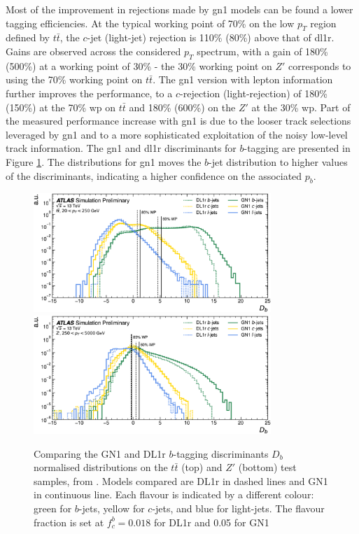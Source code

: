 Most of the improvement in rejections made by \gls{gn1} models can be found a lower tagging efficiencies. At the typical working point of 70\% on the low $p_T$ region defined by $t\bar{t}$, the $c$-jet (light-jet) rejection is 110\% (80\%) above that of \gls{dl1r}. Gains are observed across the considered $p_T$ spectrum, with a gain of 180\% (500\%) at a working point of 30\% - the 30\% working point on $Z'$ corresponds to using the 70\% working point on $t\bar{t}$. The \gls{gn1} version with lepton information further improves the performance, to a $c$-rejection (light-rejection) of 180\% (150\%) at the 70\% \gls{wp} on $t\bar{t}$ and 180\% (600\%) on the $Z'$ at the 30\% \gls{wp}. Part of the measured performance increase with \gls{gn1} is due to the looser track selections leveraged by \gls{gn1} and to a more sophisticated exploitation of the noisy low-level track information. The \gls{gn1} and \gls{dl1r} discriminants for $b$-tagging are presented in Figure \ref{fig:GN1disb}. The distributions for \gls{gn1} moves the $b$-jet distribution to higher values of the discriminants, indicating a higher confidence on the associated $p_b$. \\

\begin{figure}[h!]
  \centering
  \includegraphics[width=0.8\textwidth]{Images/FTAG/GN/GN1/eff/ttb.png}
  \includegraphics[width=0.8\textwidth]{Images/FTAG/GN/GN1/eff/zpb.png}
  \caption{Comparing the GN1 and DL1r $b$-tagging discriminants $D_b$ normalised distributions on the $t\bar{t}$ (top) and $Z'$ (bottom) test samples, from \cite{ATL-PHYS-PUB-2022-027}. Models compared are DL1r in dashed lines and GN1 in continuous line. Each flavour is indicated by a different colour: green for $b$-jets, yellow for $c$-jets, and blue for light-jets. The flavour fraction is set at $f^b_c = 0.018$ for DL1r and 0.05 for GN1}
  \label{fig:GN1disb}
\end{figure} 

